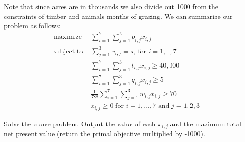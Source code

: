 Note that since acres are in thousands we also divide out 1000 from the constraints of timber and animals months of grazing. We can summarize our problem as follows:
\begin{align*}
\text{maximize } &\sum\limits_{i=1}^7 \sum\limits_{j=1}^3 p_{i,j}x_{i,j} \\
\text{subject to } &\sum\limits_{j=1}^3 x_{i,j} = s_i  \text{ for } i=1,..,7 \\
	        &\sum\limits_{i=1}^7 \sum\limits_{j=1}^3 t_{i,j}x_{i,j} \geq 40,000 \\
		&\sum\limits_{i=1}^7 \sum\limits_{j=1}^3 g_{i,j}x_{i,j} \geq 5 \\
		&\frac{1}{788} \sum\limits_{i=1}^7 \sum\limits_{j=1}^3 w_{i,j}x_{i,j} \geq 70 \\
		&x_{i,j} \geq 0 \text{ for } i=1,...,7  \text{ and } j=1,2,3
\end{align*}

\begin{problem}
Solve the above problem. Output the value of each $x_{i,j}$ and the maximum total net present value (return the primal objective multiplied by -1000).
\end{problem} 